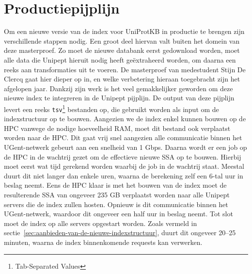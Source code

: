 \section{Productiepijplijn}
Om een nieuwe versie van de index voor UniProtKB in productie te brengen zijn verschillende stappen nodig.
Een groot deel hiervan valt buiten het domein van deze masterproef.
Zo moet de nieuwe databank eerst gedownload worden, moet alle data die Unipept hieruit nodig heeft geëxtraheerd worden, om daarna een reeks aan transformaties uit te voeren.
De masterproef van medestudent Stijn De Clercq gaat hier dieper op in, en welke verbetering hieraan toegebracht zijn het afgelopen jaar.
Dankzij zijn werk is het veel gemakkelijker geworden om deze nieuwe index te integreren in de Unipept pijplijn.
De output van deze pijplijn levert een reeks \texttt{tsv}\footnote{Tab-Separated Values} bestanden op, die gebruikt worden als input om de indexstructuur op te bouwen.
Aangezien we de index enkel kunnen bouwen op de HPC vanwege de nodige hoeveelheid RAM, moet dit bestand ook verplaatst worden naar de HPC\@.
Dit gaat vrij snel aangezien alle communicatie binnen het UGent-netwerk gebeurt aan een snelheid van 1 Gbps.
Daarna wordt er een job op de HPC in de wachtrij gezet om de effectieve nieuwe SSA op te bouwen.
Hierbij moet eerst wat tijd gerekend worden waarbij de job in de wachtrij staat.
Meestal duurt dit niet langer dan enkele uren, waarna de berekening zelf een 6-tal uur in beslag neemt.
Eens de HPC klaar is met het bouwen van de index moet de resulterende SSA van ongeveer 235 GB verplaatst worden naar alle Unipept servers die de index zullen hosten.
Opnieuw is dit communicatie binnen het UGent-netwerk, waardoor dit ongeveer een half uur in beslag neemt.
Tot slot moet de index op alle servers opgestart worden.
Zoals vermeld in sectie~\ref{sec:aanbieden-van-de-nieuwe-indexstructuur}, duurt dit ongeveer 20--25 minuten, waarna de index binnenkomende requests kan verwerken.
